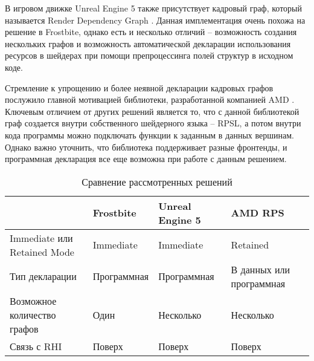 В игровом движке Unreal Engine 5 также присутствует кадровый граф, который называется Render Dependency Graph \cite{render_dependency_graph_ue5}. Данная имплементация очень похожа на решение в Frostbite, однако есть и несколько отличий -- возможность создания нескольких графов и возможность автоматической декларации использования ресурсов в шейдерах при помощи препроцессинга полей структур в исходном коде.

Стремление к упрощению и более неявной декларации кадровых графов послужило главной мотивацией библиотеки, разработанной компанией AMD \cite{amd_rps_sdk}. Ключевым отличием от других решений является то, что с данной библиотекой граф создается внутри собственного шейдерного языка -- RPSL, а потом внутри кода программы можно подключать функции к заданным в данных вершинам. Однако важно уточнить, что библиотека поддерживает разные фронтенды, и программная декларация все еще возможна при работе с данным решением.

\begin{table}[ht]
    \centering
    \begin{tabular}{ p{56mm} | p{30mm} | p{30mm} | p{30mm} }
      & Frostbite & Unreal Engine 5 & AMD RPS \\
    \hline
    Immediate или Retained Mode & Immediate & Immediate & Retained \\
    \hline
    Тип декларации & Программная & Программная & В данных или программная \\
    \hline
    Возможное количество графов & Один & Несколько & Несколько \\
    \hline
    Связь с RHI & Поверх & Поверх & Поверх \\
    \end{tabular}
    \caption{Сравнение рассмотренных решений}
    \label{tbl:comparison_analysis}
  \end{table}

